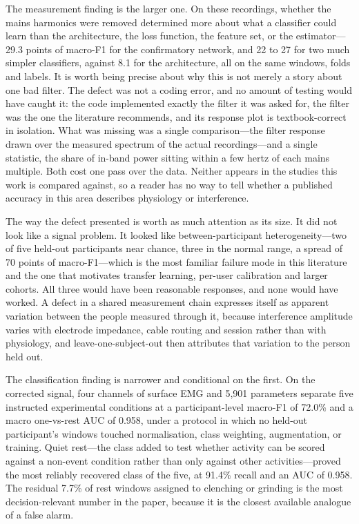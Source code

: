 \documentclass[pdflatex,sn-nature,iicol]{sn-jnl}
\begin{document}
The measurement finding is the larger one. On these recordings, whether the mains harmonics were removed determined more about what a classifier could learn than the architecture, the loss function, the feature set, or the estimator---29.3 points of macro-F1 for the confirmatory network, and 22 to 27 for two much simpler classifiers, against 8.1 for the architecture, all on the same windows, folds and labels. It is worth being precise about why this is not merely a story about one bad filter. The defect was not a coding error, and no amount of testing would have caught it: the code implemented exactly the filter it was asked for, the filter was the one the literature recommends, and its response plot is textbook-correct in isolation. What was missing was a single comparison---the filter response drawn over the measured spectrum of the actual recordings---and a single statistic, the share of in-band power sitting within a few hertz of each mains multiple. Both cost one pass over the data. Neither appears in the studies this work is compared against, so a reader has no way to tell whether a published accuracy in this area describes physiology or interference.

The way the defect presented is worth as much attention as its size. It did not look like a signal problem. It looked like between-participant heterogeneity---two of five held-out participants near chance, three in the normal range, a spread of 70 points of macro-F1---which is the most familiar failure mode in this literature and the one that motivates transfer learning, per-user calibration and larger cohorts. All three would have been reasonable responses, and none would have worked. A defect in a shared measurement chain expresses itself as apparent variation between the people measured through it, because interference amplitude varies with electrode impedance, cable routing and session rather than with physiology, and leave-one-subject-out then attributes that variation to the person held out.

The classification finding is narrower and conditional on the first. On the corrected signal, four channels of surface EMG and 5,901 parameters separate five instructed experimental conditions at a participant-level macro-F1 of 72.0\% and a macro one-vs-rest AUC of 0.958, under a protocol in which no held-out participant's windows touched normalisation, class weighting, augmentation, or training. Quiet rest---the class added to test whether activity can be scored against a non-event condition rather than only against other activities---proved the most reliably recovered class of the five, at 91.4\% recall and an AUC of 0.958. The residual 7.7\% of rest windows assigned to clenching or grinding is the most decision-relevant number in the paper, because it is the closest available analogue of a false alarm.
\end{document}
